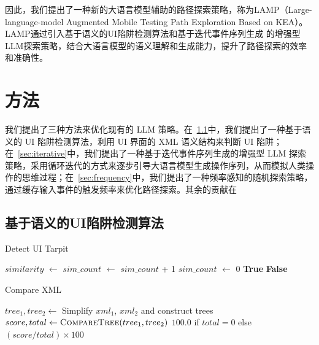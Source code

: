 \documentclass[twocolumn, 10pt]{article}
\newcommand{\kea}{K{\small\MakeUppercase{ea}}}
\newcommand{\lamp}{L{\small\MakeUppercase{amp}}}
\begin{document}
因此，我们提出了一种新的大语言模型辅助的路径探索策略，称为\lamp（Large-language-model Augmented Mobile Testing Path Exploration Based on \kea）。\lamp 通过引入基于语义的UI陷阱检测算法和基于迭代事件序列生成 的增强型LLM探索策略，结合大语言模型的语义理解和生成能力，提升了路径探索的效率和准确性。

\section{方法}

我们提出了三种方法来优化现有的 LLM 策略。在\textsection~\ref{sec:semantic}中，我们提出了一种基于语义的 UI 陷阱检测算法，利用 UI 界面的 XML 语义结构来判断 UI 陷阱；在\textsection~\ref{sec:iterative}中，我们提出了一种基于迭代事件序列生成的增强型 LLM 探索策略，采用循环迭代的方式来逐步引导大语言模型生成操作序列，从而模拟人类操作的思维过程；在\textsection~\ref{sec:frequency}中，我们提出了一种频率感知的随机探索策略，通过缓存输入事件的触发频率来优化路径探索。其余的贡献在

\subsection{基于语义的UI陷阱检测算法}
\label{sec:semantic}

\begin{algorithm}[t]
\caption{Detect UI Tarpit}
\label{alg:detect_tarpit}
\begin{algorithmic}[1]
    \State $similarity$ $\gets$ 
    \State $sim\_count$ $\gets$ $sim\_count$ + 1
        \State $sim\_count$ $\gets$ 0
        \State \Return \textbf{True}
    \EndIf
\EndIf
\State \Return \textbf{False}
\EndFunction
\end{algorithmic}
\end{algorithm}

\begin{algorithm}[t]
\caption{Compare XML}
\label{alg:compare_xml}
\begin{algorithmic}[1]
    \State $tree_1, tree_2 \gets$ Simplify $xml_1$, $xml_2$ and construct trees
    \State $score, total \gets \Call{CompareTree}{tree_1, tree_2}$
    \State \Return $100.0$ if $total = 0$ else $(score / total) \times 100$
\EndFunction
\end{algorithmic}
\end{algorithm}
\end{document}
